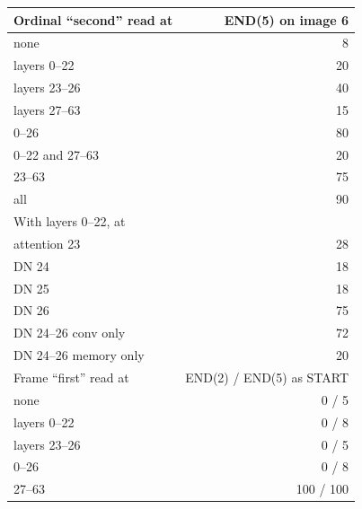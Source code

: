 \begin{tabular}{lr}
\toprule
Ordinal ``second'' read at & END(5) on image 6 \\
\midrule
none & 8 \\
layers 0--22 & 20 \\
layers 23--26 & 40 \\
layers 27--63 & 15 \\
0--26 & 80 \\
0--22 and 27--63 & 20 \\
23--63 & 75 \\
all & 90 \\
\addlinespace
With layers 0--22, at & \\
attention 23 & 28 \\
DN 24 & 18 \\
DN 25 & 18 \\
DN 26 & 75 \\
DN 24--26 conv only & 72 \\
DN 24--26 memory only & 20 \\
\midrule
Frame ``first'' read at & END(2) / END(5) as START \\
\midrule
none & 0 / 5 \\
layers 0--22 & 0 / 8 \\
layers 23--26 & 0 / 5 \\
0--26 & 0 / 8 \\
27--63 & 100 / 100 \\
\bottomrule
\end{tabular}
